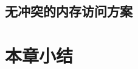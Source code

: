 \subsection[\hspace{-2pt}无冲突的内存访问方案]{{ \hspace{-8pt}无冲突的内存访问方案}}\label{section 3-3}

\section[\hspace{-2pt}本章小结]{{ \hspace{-8pt}本章小结}}\label{section 3-4}



